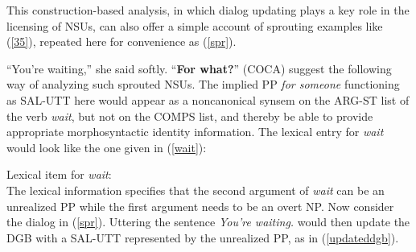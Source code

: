 {This construction-based analysis, in which dialog updating plays
a key role in the licensing of NSUs, can also offer a simple account of sprouting examples like (\ref{35}), repeated here for convenience as (\ref{spr}).

\ea ``You're waiting,'' she said softly. ``\textbf{For what?}'' (COCA) \label{spr} \z
%
\citet[331]{Ginzburg:Sag:2000} suggest the following way of analyzing such sprouted NSUs. The implied PP \textit{for someone} functioning as SAL-UTT here would appear as a noncanonical synsem on the ARG-ST list of the verb \textit{wait}, but not on the COMPS list, and thereby be able to provide appropriate morphosyntactic identity information. The lexical entry for \textit{wait} would look like the one given in (\ref{wait}):


\ea
\label{wait}
Lexical item for \textit{wait}:\\
\z
%
The lexical information specifies that the second argument of \textit{wait} can be an unrealized PP while the first argument needs to be an overt NP. Now consider the dialog in (\ref{spr}). Uttering
the sentence \textit{You're waiting.} would then update the DGB with a SAL-UTT represented by the unrealized PP, as in (\ref{updateddgb}).
%
\ea
\label{updateddgb}
}
